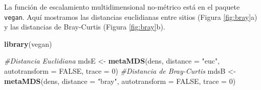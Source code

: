 \documentclass[]{book}
\newenvironment{Shaded}{\begin{snugshade}}{\end{snugshade}}
\newcommand{\KeywordTok}[1]{\textcolor[rgb]{0.13,0.29,0.53}{\textbf{{#1}}}}
\newcommand{\DataTypeTok}[1]{\textcolor[rgb]{0.13,0.29,0.53}{{#1}}}
\newcommand{\DecValTok}[1]{\textcolor[rgb]{0.00,0.00,0.81}{{#1}}}
\newcommand{\StringTok}[1]{\textcolor[rgb]{0.31,0.60,0.02}{{#1}}}
\newcommand{\CommentTok}[1]{\textcolor[rgb]{0.56,0.35,0.01}{\textit{{#1}}}}
\newcommand{\OtherTok}[1]{\textcolor[rgb]{0.56,0.35,0.01}{{#1}}}
\newcommand{\NormalTok}[1]{{#1}}
\begin{document}
\begin{Shaded}
\end{Shaded}

La función de escalamiento multidimensional no-métrico está en el
paquete \texttt{vegan}. Aquí mostramos las distancias euclidianas entre
sitios (Figura \ref{fig:bray}a) y las distancias de Bray-Curtis (Figura
\ref{fig:bray}b).

\begin{Shaded}
\begin{Highlighting}[]
\KeywordTok{library}\NormalTok{(vegan) }

\CommentTok{#Distancia Euclidiana}
\NormalTok{mdsE <-}\StringTok{ }\KeywordTok{metaMDS}\NormalTok{(dens, }\DataTypeTok{distance =} \StringTok{"euc"}\NormalTok{, }\DataTypeTok{autotransform =} \OtherTok{FALSE}\NormalTok{, }\DataTypeTok{trace =} \DecValTok{0}\NormalTok{) }
\CommentTok{#Distancia de Bray-Curtis}
\NormalTok{mdsB <-}\StringTok{ }\KeywordTok{metaMDS}\NormalTok{(dens, }\DataTypeTok{distance =} \StringTok{"bray"}\NormalTok{, }\DataTypeTok{autotransform =} \OtherTok{FALSE}\NormalTok{, }\DataTypeTok{trace =} \DecValTok{0}\NormalTok{) }
\end{Highlighting}
\end{Shaded}
\end{document}
